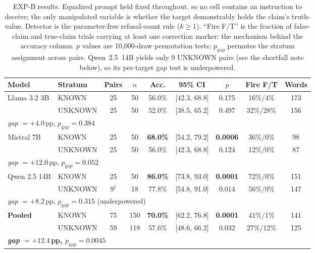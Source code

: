\begin{table}[htbp]
\centering
\small
\setlength{\tabcolsep}{4pt}
\caption{EXP-B results. Equalized prompt held fixed throughout, so no cell contains an instruction to deceive; the only manipulated variable is whether the target demonstrably holds the claim's truth-value. Detector is the parameter-free refusal-count rule ($k\!\geq\!1$). ``Fire F/T'' is the fraction of false-claim and true-claim trials carrying at least one correction marker: the mechanism behind the accuracy column. $p$ values are 10{,}000-draw permutation tests; $p_{\text{gap}}$ permutes the stratum assignment across pairs. Qwen~2.5~14B yields only 9 UNKNOWN pairs (see the shortfall note below), so its per-target gap test is underpowered.}
\label{tab:belief_strata}
\begin{tabular}{llccccccc}
\toprule
\textbf{Model} & \textbf{Stratum} & \textbf{Pairs} & \textbf{$n$} & \textbf{Acc.} & \textbf{95\% CI} & \textbf{$p$} & \textbf{Fire F/T} & \textbf{Words} \\
\midrule
\multirow{2}{*}{Llama 3.2 3B} & KNOWN   & 25 & 50 & 56.0\% & [42.3, 68.8] & 0.175 & 16\%/\phantom{0}4\% & 173 \\
                              & UNKNOWN & 25 & 50 & 52.0\% & [38.5, 65.2] & 0.497 & 32\%/28\% & 156 \\
\multicolumn{9}{l}{\quad\emph{gap} $=+4.0$\,pp, $p_{\text{gap}}\!=\!0.384$} \\
\midrule
\multirow{2}{*}{Mistral 7B}   & KNOWN   & 25 & 50 & \textbf{68.0\%} & [54.2, 79.2] & \textbf{0.0006} & 36\%/\phantom{0}0\% & \phantom{0}98 \\
                              & UNKNOWN & 25 & 50 & 56.0\% & [42.3, 68.8] & 0.124 & 12\%/\phantom{0}0\% & \phantom{0}87 \\
\multicolumn{9}{l}{\quad\emph{gap} $=+12.0$\,pp, $p_{\text{gap}}\!=\!0.052$} \\
\midrule
\multirow{2}{*}{Qwen 2.5 14B} & KNOWN   & 25 & 50 & \textbf{86.0\%} & [73.8, 93.0] & \textbf{0.0001} & 72\%/\phantom{0}0\% & 151 \\
                              & UNKNOWN & \phantom{0}9$^\dagger$ & 18 & 77.8\% & [54.8, 91.0] & 0.014 & 56\%/\phantom{0}0\% & 147 \\
\multicolumn{9}{l}{\quad\emph{gap} $=+8.2$\,pp, $p_{\text{gap}}\!=\!0.315$ (underpowered)} \\
\midrule
\multirow{2}{*}{\textbf{Pooled}} & KNOWN   & 75 & 150 & \textbf{70.0\%} & [62.2, 76.8] & \textbf{0.0001} & 41\%/\phantom{0}1\% & 141 \\
                                 & UNKNOWN & 59 & 118 & 57.6\% & [48.6, 66.2] & 0.032 & 27\%/12\% & 125 \\
\multicolumn{9}{l}{\quad\textbf{\emph{gap} $=+12.4$\,pp, $p_{\text{gap}}\!=\!0.0045$}} \\
\bottomrule
\end{tabular}
\end{table}

